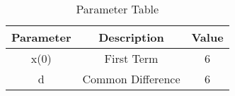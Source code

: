 
\begin{table}[ht]
  \centering
  \begin{tabular}{|c||c||c|}
    \hline
    Parameter & Description & Value \\
    \hline
     x(0) & First Term & 6\\
     \hline
     d & Common Difference & 6\\
    \hline
  \end{tabular}
  \vspace{2mm}
  \caption{Parameter Table}
\end{table}